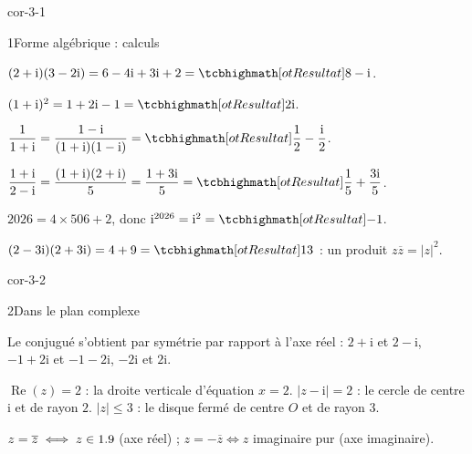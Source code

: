 
\corrigesSouples

\begin{blocLivre}{cor-3-1}
\begin{corrige}{1}{Forme algébrique : calculs}
\begin{questions}
  \item $(2+\mathrm{i})(3-2\mathrm{i})=6-4\mathrm{i}+3\mathrm{i}+2=\res{8-\mathrm{i}}$.
  \item $(1+\mathrm{i})^{2}=1+2\mathrm{i}-1=\res{2\mathrm{i}}$.
  \item $\dfrac{1}{1+\mathrm{i}}=\dfrac{1-\mathrm{i}}{(1+\mathrm{i})(1-\mathrm{i})}
    =\res{\dfrac12-\dfrac{\mathrm{i}}{2}}$.
  \item $\dfrac{1+\mathrm{i}}{2-\mathrm{i}}=\dfrac{(1+\mathrm{i})(2+\mathrm{i})}{5}
    =\dfrac{1+3\mathrm{i}}{5}=\res{\dfrac15+\dfrac{3\mathrm{i}}{5}}$.
  \item $2026=4\times506+2$, donc $\mathrm{i}^{2026}=\mathrm{i}^{2}=\res{-1}$.
  \item $(2-3\mathrm{i})(2+3\mathrm{i})=4+9=\res{13}$ : un produit $z\overline{z}=|z|^{2}$.
\end{questions}
\end{corrige}
\end{blocLivre}

\begin{blocLivre}{cor-3-2}
\begin{corrige}{2}{Dans le plan complexe}
\begin{questions}
  \item Le conjugué s'obtient par symétrie par rapport à l'axe réel :
    $2+\mathrm{i}$ et $2-\mathrm{i}$, $-1+2\mathrm{i}$ et $-1-2\mathrm{i}$,
    $-2\mathrm{i}$ et $2\mathrm{i}$.
  \item $\operatorname{Re}(z)=2$ : la droite verticale d'équation $x=2$.\quad
    $|z-\mathrm{i}|=2$ : le cercle de centre $\mathrm{i}$ et de rayon $2$.\quad
    $|z|\leq3$ : le disque fermé de centre $O$ et de rayon $3$.
  \item $z=\overline{z}\iff z\in1.9$ (axe réel) ; $z=-\overline{z}\iff z$
    imaginaire pur (axe imaginaire).
\end{questions}
\end{corrige}
\end{blocLivre}

